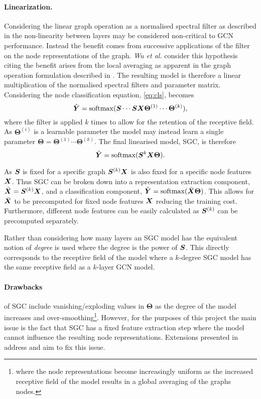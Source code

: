 \paragraph{Linearization.}
Considering the linear graph operation as a normalised spectral filter as described in  the non-linearity between layers may be considered non-critical to GCN performance.
Instead the benefit comes from successive applications of the filter on the node representations of the graph.
\textit{Wu et al.}\cite{wu2019simplifying} consider this hypothesis citing the benefit arises from the local averaging as apparent in the graph operation formulation described in .
The resulting model is therefore a linear multiplication of the normalised spectral filters and parameter matrix.
Considering the node classification equation, \ref{eq:cls}, becomes
\begin{equation}
    \hat{{\bm{Y}}} = \operatorname{softmax}({\bm{S}}\cdots{\bm{S}}{\bm{X}}\bm{\Theta}^{(1)}\cdots\bm{\Theta}^{(k)}),
\end{equation}
where the filter is applied $k$ times to allow for the retention of the receptive field.
As $\bm{\Theta}^{(i)}$ is a learnable parameter the model may instead learn a single parameter $\bm{\Theta} = \bm{\Theta}^{(1)}\cdots\bm{\Theta}^{(k)}$.
The final linearised model, SGC, is therefore
\begin{equation}
    \hat{{\bm{Y}}} = \operatorname{softmax}({\bm{S}}^{k}{\bm{X}}\bm{\Theta}).
\end{equation}

As ${\bm{S}}$ is fixed for a specific graph ${\bm{S}}^{(k)}{\bm{X}}$ is also fixed for a specific node features ${\bm{X}}$.
Thus SGC can be broken down into a representation extraction component, $\bar{{\bm{X}}} = {\bm{S}}^{(k)}{\bm{X}}$, and a classification component, $\hat{{\bm{Y}}} = \operatorname{softmax}(\bar{{\bm{X}}}\bm{\Theta})$.
This allows for $\bar{{\bm{X}}}$ to be precomputed for fixed node features ${\bm{X}}$ reducing the training cost.
Furthermore, different node features can be easily calculated as ${\bm{S}}^{(k)}$ can be precomputed separately.

Rather than considering how many layers an SGC model has the equivalent notion of \emph{degree} is used where the degree is the power of ${\bm{S}}$.
This directly corresponds to the receptive field of the model where a $k$-degree SGC model has the same receptive field as a $k$-layer GCN model.

\paragraph{Drawbacks}
of SGC include vanishing/exploding values in $\bm{\Theta}$ as the degree of the model increases and over-smoothing\footnote{where the node representations become increasingly uniform as the increased receptive field of the model results in a global averaging of the graphs nodes.}.
However, for the purposes of this project the main issue is the fact that SGC has a fixed feature extraction step where the model cannot influence the resulting node representations.
Extensions presented in  address and aim to fix this issue.

